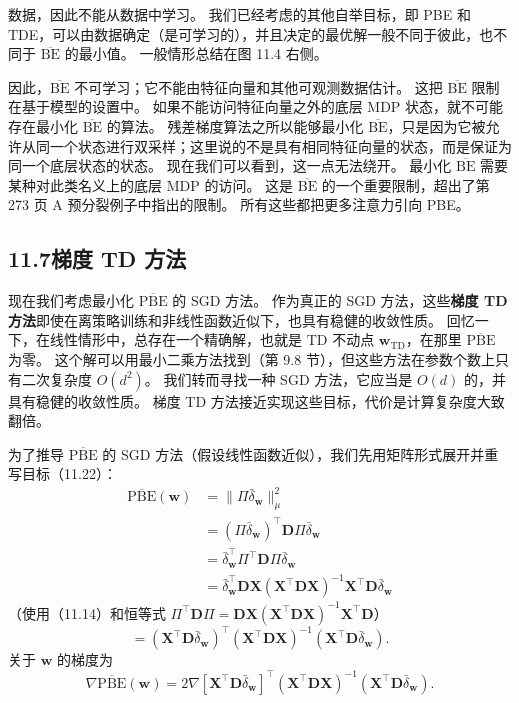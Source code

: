 \documentclass[UTF8,12pt,a4paper,fontset=fandol]{ctexart}
\begin{document}
数据，因此不能从数据中学习。
我们已经考虑的其他自举目标，即 PBE 和 TDE，可以由数据确定（是可学习的），并且决定的最优解一般不同于彼此，也不同于 $\overline{\mathrm{BE}}$ 的最小值。
一般情形总结在图 11.4 右侧。

因此，$\overline{\mathrm{BE}}$ 不可学习；它不能由特征向量和其他可观测数据估计。
这把 $\overline{\mathrm{BE}}$ 限制在基于模型的设置中。
如果不能访问特征向量之外的底层 MDP 状态，就不可能存在最小化 $\overline{\mathrm{BE}}$ 的算法。
残差梯度算法之所以能够最小化 $\overline{\mathrm{BE}}$，只是因为它被允许从同一个状态进行双采样；这里说的不是具有相同特征向量的状态，而是保证为同一个底层状态的状态。
现在我们可以看到，这一点无法绕开。
最小化 $\overline{\mathrm{BE}}$ 需要某种对此类名义上的底层 MDP 的访问。
这是 $\overline{\mathrm{BE}}$ 的一个重要限制，超出了第 273 页 A 预分裂例子中指出的限制。
所有这些都把更多注意力引向 PBE。

\subsection*{11.7\quad 梯度 TD 方法}

现在我们考虑最小化 $\overline{\mathrm{PBE}}$ 的 SGD 方法。
作为真正的 SGD 方法，这些\textbf{梯度 TD 方法}即使在离策略训练和非线性函数近似下，也具有稳健的收敛性质。
回忆一下，在线性情形中，总存在一个精确解，也就是 TD 不动点 $\mathbf{w}_{\mathrm{TD}}$，在那里 $\overline{\mathrm{PBE}}$ 为零。
这个解可以用最小二乘方法找到（第 9.8 节），但这些方法在参数个数上只有二次复杂度 $O(d^2)$。
我们转而寻找一种 SGD 方法，它应当是 $O(d)$ 的，并具有稳健的收敛性质。
梯度 TD 方法接近实现这些目标，代价是计算复杂度大致翻倍。

为了推导 $\overline{\mathrm{PBE}}$ 的 SGD 方法（假设线性函数近似），我们先用矩阵形式展开并重写目标（11.22）：
\begin{equation}
\begin{aligned}
\overline{\mathrm{PBE}}(\mathbf{w})
&=\|\Pi\bar\delta_{\mathbf{w}}\|_\mu^2\\
&=(\Pi\bar\delta_{\mathbf{w}})^\top\mathbf{D}\Pi\bar\delta_{\mathbf{w}}\\
&=\bar\delta_{\mathbf{w}}^\top\Pi^\top\mathbf{D}\Pi\bar\delta_{\mathbf{w}}\\
&=\bar\delta_{\mathbf{w}}^\top\mathbf{D}\mathbf{X}(\mathbf{X}^\top\mathbf{D}\mathbf{X})^{-1}\mathbf{X}^\top\mathbf{D}\bar\delta_{\mathbf{w}}
\end{aligned}
\tag{11.25}
\end{equation}
（使用（11.14）和恒等式
$\Pi^\top\mathbf{D}\Pi=\mathbf{D}\mathbf{X}(\mathbf{X}^\top\mathbf{D}\mathbf{X})^{-1}\mathbf{X}^\top\mathbf{D}$）
\begin{equation}
=\left(\mathbf{X}^\top\mathbf{D}\bar\delta_{\mathbf{w}}\right)^\top
\left(\mathbf{X}^\top\mathbf{D}\mathbf{X}\right)^{-1}
\left(\mathbf{X}^\top\mathbf{D}\bar\delta_{\mathbf{w}}\right).
\tag{11.26}
\end{equation}
关于 $\mathbf{w}$ 的梯度为
\[
\nabla\overline{\mathrm{PBE}}(\mathbf{w})
=2\nabla\left[\mathbf{X}^\top\mathbf{D}\bar\delta_{\mathbf{w}}\right]^\top
\left(\mathbf{X}^\top\mathbf{D}\mathbf{X}\right)^{-1}
\left(\mathbf{X}^\top\mathbf{D}\bar\delta_{\mathbf{w}}\right).
\]
\end{document}
